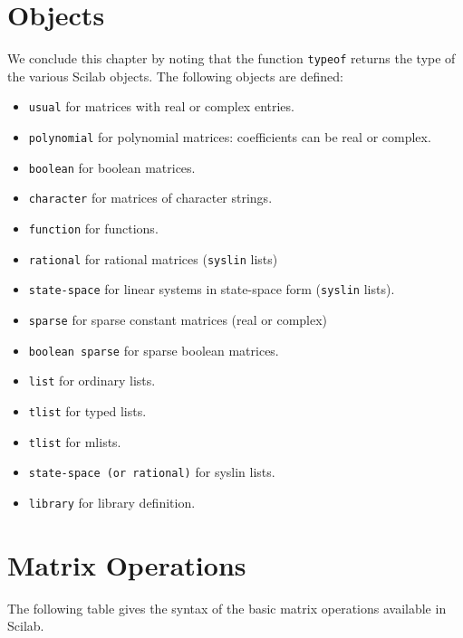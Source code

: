 \section{Objects}
We conclude this chapter by noting that the function {\tt typeof}
returns the type of the various Scilab objects. The following objects
are defined:
\begin{itemize}
\item{\tt usual} 	for matrices with real or complex entries.
\item{\tt polynomial} 	for polynomial matrices: coefficients can be 
real or complex.
\item{\tt boolean} 	for boolean matrices.
\item{\tt character} 	for matrices of character strings.
\item{\tt function} 	for functions.
\item{\tt rational} 	for rational matrices ({\tt syslin} lists)
\item{\tt state-space} 	for linear systems in state-space 
form ({\tt syslin} lists).
\item{\tt sparse} 	for sparse constant matrices (real or complex)
\item{\tt boolean sparse} for sparse boolean matrices.
\item{\tt list} 	for ordinary lists.
\item{\tt tlist}        for typed lists.
\item{\tt tlist}        for mlists.
\item{\tt state-space (or rational)} for syslin lists.
\item{\tt library} 	for library definition.
\end{itemize}


\section{Matrix Operations}
The following table gives the syntax of the basic matrix operations
available in Scilab.

